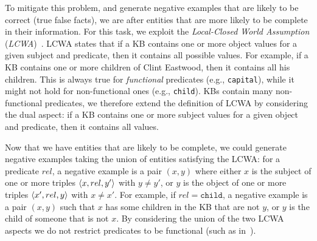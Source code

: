 To mitigate this problem, and generate negative examples that are likely to be correct (true false facts), we are after entities that are more likely to be complete in their information. For this task, we %
exploit the \emph{Local-Closed World Assumption} (\emph{LCWA})~\cite{dong2014data,galarraga2015fast}. LCWA states that if a KB contains one or more object values for a given subject and predicate, then it contains all possible values. For example, if a KB contains one or more children of Clint Eastwood, then it contains all his children. This is always true for \emph{functional} predicates (e.g., \texttt{capital}), 
while it might not hold for non-functional ones (e.g., \texttt{child}). 
KBs contain many non-functional predicates, we therefore extend the definition of LCWA by considering the dual aspect: if a KB contains one or more subject values for a given object and predicate, then it contains all values. 

Now that we have entities that are likely to be complete, we could generate negative examples taking the union of entities satisfying the LCWA: 
for a predicate $rel$, a negative example is a pair $(x,y)$ where either $x$ is the subject of one or more triples $\langle x,rel,y'\rangle$ with $y \neq y'$, or $y$ is the object of one or more triples $\langle x',rel,y\rangle$ with $x \neq x'$. 
For example, if $rel=\texttt{child}$, a negative example is a pair $(x,y)$ such that $x$ has some children in the KB that are not $y$, or $y$ is the child of someone that is not $x$. By considering the union of the two LCWA aspects we do not restrict predicates to be functional (such as in~\cite{galarraga2015fast}). 

